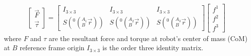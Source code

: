 \documentclass[]{article}
\begin{document}
\begin{eqnarray}
\begin{bmatrix}
\vec{F}\\
\vec{\tau}
\end{bmatrix}
=
\begin{bmatrix}
I_{3\times3}	&I_{3\times3}	&I_{3\times3}	\\
S(^0(_B^{A_1}\vec{r}))	&S(^0(_B^{A_2}\vec{r}))	&S(^0(_B^{A_3}\vec{r}))
\end{bmatrix}
\begin{bmatrix}
f^1	\\
f^2	\\
f^3
\end{bmatrix}
\end{eqnarray}
where $F$ and $\tau$ are the resultant force and torque at robot's center of mass (CoM) at $B$ reference frame origin $I_{3\times3}$ is the order three identity matrix.%
\end{document}
